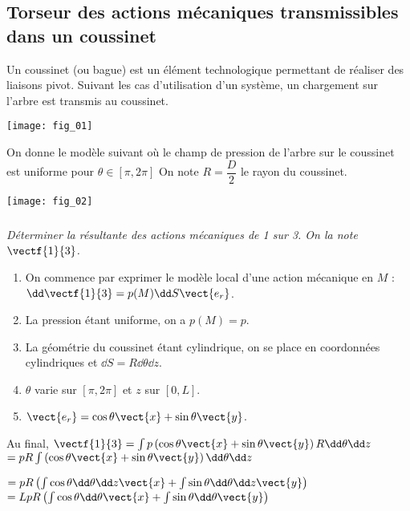 \ifprof
\begin{multicols}{2}
\else
\begin{multicols}{2}
\fi

\section*{Torseur des actions mécaniques transmissibles dans un coussinet}


\ifprof
\else
Un coussinet (ou bague) est un élément technologique permettant de réaliser des liaisons pivot. Suivant les cas d'utilisation d'un système, un chargement sur l'arbre est transmis au coussinet. 

\begin{center}
\texttt{[image: fig\_01]}
\end{center}


On donne le modèle suivant où le champ de pression de l'arbre sur le coussinet est uniforme pour $\theta\in[\pi,2\pi]$ 
On note $R=\dfrac{D}{2}$ le rayon du coussinet. 

\begin{center}
\texttt{[image: fig\_02]}
\end{center}
\fi

\subparagraph{}\textit{Déterminer la résultante des actions mécaniques de 1 sur 3. On la note $\vectf{1}{3}$.}
\ifprof
\begin{corrige}
\begin{enumerate}
\item On commence par exprimer le modèle local d'une action mécanique en $M$ : $\dd \vectf{1}{3} = p(M) \dd S \vect{e_r}$.
\item La pression étant uniforme, on a $p(M)=p$.
\item La géométrie du coussinet étant cylindrique, on se place en coordonnées cylindriques et $\dd S = R\dd \theta \dd z$.  
\item $\theta$ varie sur $[\pi, 2\pi]$ et $z$ sur $[0,L]$. 
\item $\vect{e_r}=\cos\theta\vect{x}+\sin\theta\vect{y}$.
\end{enumerate}
Au final, $\vectf{1}{3}=\int p  \left( \cos\theta\vect{x}+\sin\theta\vect{y}\right)R\dd \theta \dd z$
$=pR\int \left( \cos\theta\vect{x}+\sin\theta\vect{y}\right)\dd \theta \dd z$

$=pR\left( \int  \cos\theta\dd \theta \dd z \vect{x}+\int \sin\theta\dd \theta \dd z   \vect{y}\right)$
$=LpR\left( \int  \cos\theta\dd \theta  \vect{x}+\int \sin\theta\dd \theta   \vect{y}\right)$


\end{corrige}
\end{multicols}
\end{multicols}
